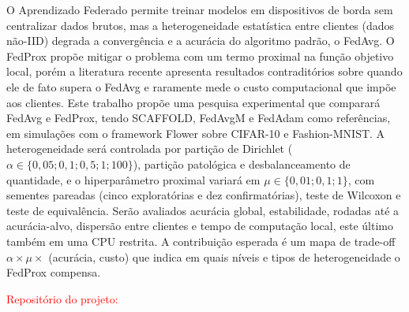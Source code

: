 O Aprendizado Federado permite treinar modelos em dispositivos de borda sem centralizar dados brutos, mas a heterogeneidade estatística entre clientes (dados não-IID) degrada a convergência e a acurácia do algoritmo padrão, o FedAvg. O FedProx propõe mitigar o problema com um termo proximal na função objetivo local, porém a literatura recente apresenta resultados contraditórios sobre quando ele de fato supera o FedAvg e raramente mede o custo computacional que impõe aos clientes. Este trabalho propõe uma pesquisa experimental que comparará FedAvg e FedProx, tendo SCAFFOLD, FedAvgM e FedAdam como referências, em simulações com o framework Flower sobre CIFAR-10 e Fashion-MNIST. A heterogeneidade será controlada por partição de Dirichlet ($\alpha \in \{0{,}05; 0{,}1; 0{,}5; 1; 100\}$), partição patológica e desbalanceamento de quantidade, e o hiperparâmetro proximal variará em $\mu \in \{0{,}01; 0{,}1; 1\}$, com sementes pareadas (cinco exploratórias e dez confirmatórias), teste de Wilcoxon e teste de equivalência. Serão avaliados acurácia global, estabilidade, rodadas até a acurácia-alvo, dispersão entre clientes e tempo de computação local, este último também em uma CPU restrita. A contribuição esperada é um mapa de trade-off $\alpha \times \mu \times$ (acurácia, custo) que indica em quais níveis e tipos de heterogeneidade o FedProx compensa.

\textcolor{red}{Repositório do projeto: \linkProjeto}
